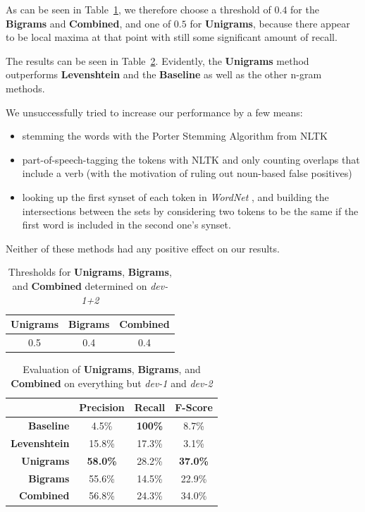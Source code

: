 \documentclass[a4paper,10pt]{scrartcl}
\theoremstyle{style}
\begin{document}
As can be seen in Table~\ref{thresholds}, we therefore choose a threshold of $0.4$ for the \textbf{Bigrams} and \textbf{Combined}, and one of $0.5$ for \textbf{Unigrams}, because there appear to be local maxima at that point with still some significant amount of recall.

The results can be seen in Table~\ref{eval_redundancy}. Evidently, the \textbf{Unigrams} method outperforms \textbf{Levenshtein} and the \textbf{Baseline} as well as the other n-gram methods.

We unsuccessfully tried to increase our performance by a few means:

\begin{itemize}
\item stemming the words with the Porter Stemming Algorithm \citep{porter1980algorithm} from NLTK \citep{bird2009natural}
\item part-of-speech-tagging the tokens with NLTK and only counting overlaps that include a verb (with the motivation of ruling out noun-based false positives)
\item looking up the first synset of each token in \textit{WordNet} \citep{fellbaum2005wordnet}, and building the intersections between the sets by considering two tokens to be the same if the first word is included in the second one's synset.
\end{itemize}

Neither of these methods had any positive effect on our results.

\begin{table}
\begin{center}
\begin{tabular}{|c|c|c|}
\textbf{Unigrams} & \textbf{Bigrams} & \textbf{Combined} \\
\hline
0.5 & 0.4 & 0.4
\end{tabular}
\end{center}
\caption{Thresholds for \textbf{Unigrams}, \textbf{Bigrams}, and \textbf{Combined} determined on \textit{dev-1+2}}
\label{thresholds}
\end{table}

\begin{table}
\begin{center}
\begin{tabular}{|r|c|c|c|}
\hline
& Precision & Recall & F-Score \\
\hline
\textbf{Baseline} & 4.5\% & \textbf{100\%} & 8.7\% \\
\hline
\textbf{Levenshtein} & 15.8\% & 17.3\% & 3.1\% \\
\hline
\textbf{Unigrams} & \textbf{58.0\%} & 28.2\% & \textbf{37.0\%} \\
\hline
\textbf{Bigrams} & 55.6\% & 14.5\% & 22.9\% \\
\hline
\textbf{Combined} & 56.8\% & 24.3\% & 34.0\% \\
\hline
\end{tabular}
\end{center}
\caption{Evaluation of \textbf{Unigrams}, \textbf{Bigrams}, and \textbf{Combined} on everything but \textit{dev-1} and \textit{dev-2}}
\label{eval_redundancy}
\end{table}
\end{document}
